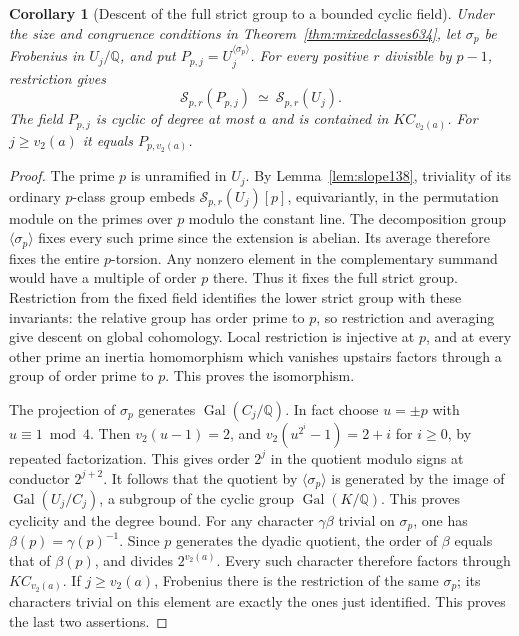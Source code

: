 \documentclass[a4paper,11pt]{article}
\newtheorem{corollary}[proposition]{Corollary}
\theoremstyle{definition}
\theoremstyle{remark}
\numberwithin{equation}{section}
\begin{document}
\begin{corollary}[Descent of the full strict group to a bounded cyclic field]
\leavevmode\label{cor:frobenius634}
Under the size and congruence conditions in
Theorem~\ref{thm:mixedclasses634}, let \(\sigma_p\) be Frobenius
in \(U_j/\mathbb Q\), and put \(P_{p,j}=U_j^{\langle\sigma_p\rangle}\).
For every positive \(r\) divisible by \(p-1\), restriction gives
\[
          \mathcal S_{p,r}(P_{p,j})
                      \ \simeq\ \mathcal S_{p,r}(U_j).
\]
The field \(P_{p,j}\) is cyclic of degree at most \(a\) and is
contained in \(K C_{v_2(a)}\). For \(j\ge v_2(a)\) it equals
\(P_{p,v_2(a)}\).
\end{corollary}
\begin{proof}
The prime \(p\) is unramified in \(U_j\). By
Lemma~\ref{lem:slope138}, triviality of its ordinary \(p\)-class
group embeds \(\mathcal S_{p,r}(U_j)[p]\), equivariantly, in the
permutation module on the primes over \(p\) modulo the constant
line. The decomposition group \(\langle\sigma_p\rangle\) fixes
every such prime since the extension is abelian. Its average
therefore fixes the entire \(p\)-torsion. Any nonzero element
in the complementary summand would have a multiple of order \(p\)
there. Thus it fixes the full strict group. Restriction from the
fixed field identifies the lower strict group with these invariants:
the relative group has order prime to \(p\), so restriction and
averaging give descent on global cohomology. Local restriction is
injective at \(p\), and at every other prime an inertia homomorphism
which vanishes upstairs factors through a group of order prime to
\(p\). This proves the isomorphism.

The projection of \(\sigma_p\) generates
\(\operatorname{Gal}(C_j/\mathbb Q)\). In fact choose \(u=\pm p\)
with \(u\equiv1\bmod4\). Then \(v_2(u-1)=2\), and
\(v_2(u^{2^i}-1)=2+i\) for \(i\ge0\), by repeated factorization.
This gives order \(2^j\) in the quotient modulo signs at conductor
\(2^{j+2}\). It follows that the quotient by \(\langle\sigma_p\rangle\)
is generated by the image of \(\operatorname{Gal}(U_j/C_j)\), a
subgroup of the cyclic group \(\operatorname{Gal}(K/\mathbb Q)\).
This proves cyclicity and the degree bound. For any character
\(\gamma\beta\) trivial on \(\sigma_p\), one has
\(\beta(p)=\gamma(p)^{-1}\). Since \(p\) generates the dyadic
quotient, the order of \(\beta\) equals that of \(\beta(p)\),
and divides \(2^{v_2(a)}\). Every such character therefore factors
through \(K C_{v_2(a)}\). If \(j\ge v_2(a)\), Frobenius there is the
restriction of the same \(\sigma_p\); its characters trivial on this
element are exactly the ones just identified. This proves the last
two assertions.
\end{proof}
\end{document}
